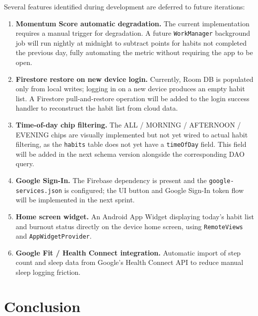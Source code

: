 \documentclass[12pt,a4paper]{article}
\begin{document}
Several features identified during development are deferred to future iterations:

\begin{enumerate}[leftmargin=1.5em, itemsep=5pt]
    \item \textbf{Momentum Score automatic degradation.} The current implementation
    requires a manual trigger for degradation. A future \texttt{WorkManager} background
    job will run nightly at midnight to subtract points for habits not completed the
    previous day, fully automating the metric without requiring the app to be open.

    \item \textbf{Firestore restore on new device login.} Currently, Room DB is
    populated only from local writes; logging in on a new device produces an empty
    habit list. A Firestore pull-and-restore operation will be added to the login
    success handler to reconstruct the habit list from cloud data.

    \item \textbf{Time-of-day chip filtering.} The ALL / MORNING / AFTERNOON / EVENING
    chips are visually implemented but not yet wired to actual habit filtering, as
    the \texttt{habits} table does not yet have a \texttt{timeOfDay} field. This field
    will be added in the next schema version alongside the corresponding DAO query.

    \item \textbf{Google Sign-In.} The Firebase dependency is present and the
    \texttt{google-services.json} is configured; the UI button and Google Sign-In
    token flow will be implemented in the next sprint.

    \item \textbf{Home screen widget.} An Android App Widget displaying today's
    habit list and burnout status directly on the device home screen, using
    \texttt{RemoteViews} and \texttt{AppWidgetProvider}.

    \item \textbf{Google Fit / Health Connect integration.} Automatic import of
    step count and sleep data from Google's Health Connect API to reduce manual
    sleep logging friction.
\end{enumerate}

\section{Conclusion}
\end{document}
